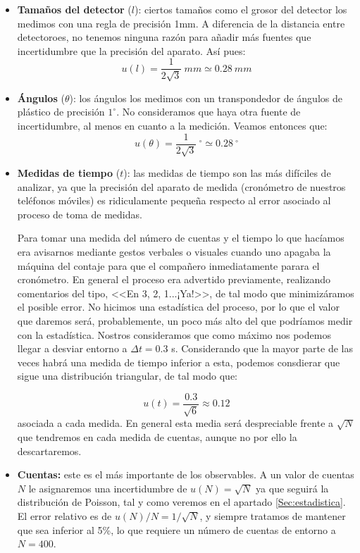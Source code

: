 \documentclass[11pt]{article}
\begin{document}
\begin{itemize}
	\item \textbf{Tamaños del detector} ($l$): ciertos tamaños como el grosor del detector los medimos con una regla de precisión 1mm. A diferencia de la distancia entre detectoroes, no tenemos ninguna razón para añadir más fuentes que incertidumbre que la precisión del aparato. Así pues: 
	\begin{equation}
		u (l)  = \frac{1}{2\sqrt3} \ \unit{mm} \simeq 0.28 \ \unit{mm}
	\end{equation}
	\item \textbf{Ángulos} ($\theta$): los ángulos los medimos con un transpondedor de ángulos de plástico de precisión $1^{\circ}$. No consideramos que haya otra fuente de incertidumbre, al menos en cuanto a la medición. Veamos entonces que:
	      \begin{equation}
		      u (\theta)  = \frac{1}{2\sqrt3} \ \unit{^\circ} \simeq 0.28 \ \unit{\unit{^\circ}}
	      \end{equation}
	\item \textbf{Medidas de tiempo} ($t$): las medidas de tiempo son las más difíciles de analizar, ya que la precisión del aparato de medida (cronómetro de nuestros teléfonos móviles) es ridiculamente pequeña respecto al error asociado al proceso de toma de medidas.

	      Para tomar una medida del número de cuentas y el tiempo lo que hacíamos era avisarnos mediante gestos verbales o visuales cuando uno apagaba la máquina del contaje para que el compañero inmediatamente parara el cronómetro. En general el proceso era advertido previamente, realizando comentarios del tipo, <<En 3, 2, 1...¡Ya!>>, de tal modo que minimizáramos el posible error. No hicimos una estadística del proceso, por lo que el valor que daremos será, probablemente, un poco más alto del que podríamos medir con la estadística. Nostros consideramos que como máximo nos podemos llegar a desviar entorno a $\Delta t=0.3$ s. Considerando que la mayor parte de las veces habrá una medida de tiempo inferior a esta, podemos consdierar que sigue una distribución triangular, de tal modo que:

	      \begin{equation}
		      u(t) = \frac{0.3}{\sqrt{6}} \approx 0.12
	      \end{equation}
	      asociada a cada medida. En general esta media será despreciable frente a $\sqrt{N}$ que tendremos en cada medida de cuentas, aunque no por ello la descartaremos.
	\item \textbf{Cuentas:} este es el más importante de los observables. A un valor de cuentas $N$ le asignaremos una incertidumbre de $u(N)=\sqrt{N}$ ya que seguirá la distribución de Poisson, tal y como veremos en el apartado \ref{Sec:estadistica}. El error relativo es de $u(N)/N=1/\sqrt{N}$, y siempre tratamos de mantener que sea inferior al 5\%, lo que requiere un número de cuentas de entorno a $N=400$.
\end{itemize}
\end{document}
